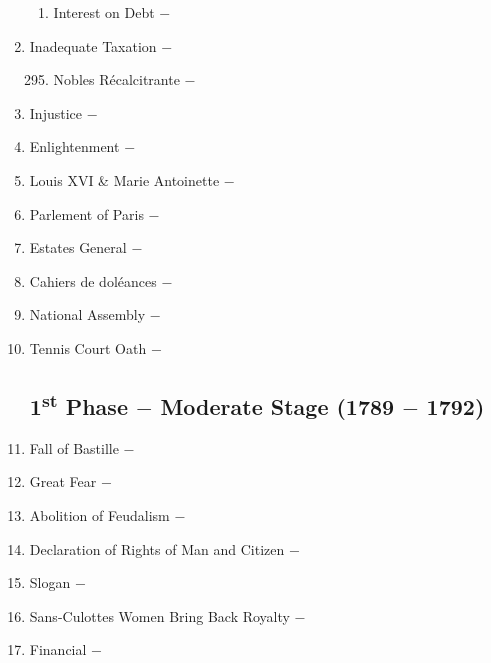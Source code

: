 \documentclass[12pt]{article}
\begin{document}
\begin{enumerate}
\begin{enumerate}[label=\arabic{*}.]
\item Interest on Debt $-$ 

\end{enumerate}
\setcounter{enumi}{293}

\item Inadequate Taxation $-$ 

\begin{enumerate}[label=\arabic{*}.]
\setcounter{enumii}{294}

\item Nobles R\'ecalcitrante $-$

\end{enumerate}
\setcounter{enumi}{295}

\item Injustice $-$

\item Enlightenment $-$ 

\item Louis XVI \& Marie Antoinette $-$

\item Parlement of Paris $-$ 

\item Estates General $-$ 

\item Cahiers de dol\'eances $-$

\item National Assembly $-$

\item Tennis Court Oath $-$ 

\subsection{1\textsuperscript{st} Phase $-$ Moderate Stage (1789 $-$ 1792)}

\item Fall of Bastille $-$ 

\item Great Fear $-$ 

\item Abolition of Feudalism $-$ 

\item Declaration of Rights of Man and Citizen $-$ 

\item Slogan $-$ 

\item Sans-Culottes Women Bring Back Royalty $-$ 

\item Financial $-$ 


\end{enumerate}
\end{document}
